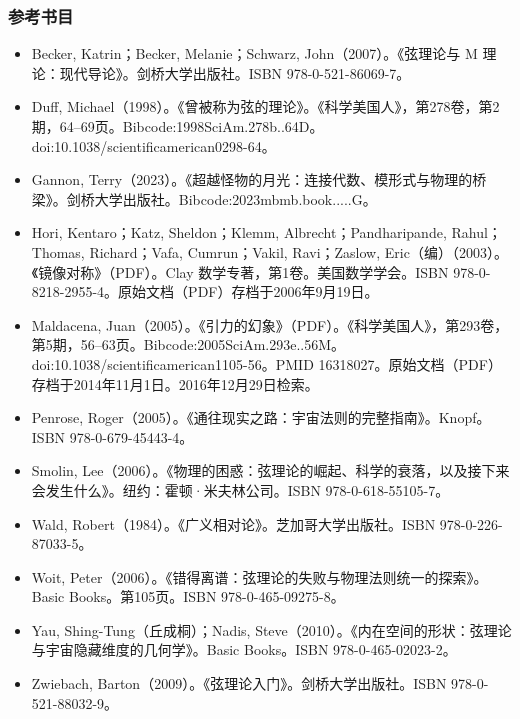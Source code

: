 \subsubsection{参考书目}  
\begin{itemize}
\item Becker, Katrin；Becker, Melanie；Schwarz, John（2007）。《弦理论与 M 理论：现代导论》。剑桥大学出版社。ISBN 978-0-521-86069-7。  
\item Duff, Michael（1998）。《曾被称为弦的理论》。《科学美国人》，第278卷，第2期，64–69页。Bibcode:1998SciAm.278b..64D。doi:10.1038/scientificamerican0298-64。  
\item Gannon, Terry（2023）。《超越怪物的月光：连接代数、模形式与物理的桥梁》。剑桥大学出版社。Bibcode:2023mbmb.book.....G。  
\item Hori, Kentaro；Katz, Sheldon；Klemm, Albrecht；Pandharipande, Rahul；Thomas, Richard；Vafa, Cumrun；Vakil, Ravi；Zaslow, Eric（编）（2003）。《镜像对称》（PDF）。Clay 数学专著，第1卷。美国数学学会。ISBN 978-0-8218-2955-4。原始文档（PDF）存档于2006年9月19日。  
\item Maldacena, Juan（2005）。《引力的幻象》（PDF）。《科学美国人》，第293卷，第5期，56–63页。Bibcode:2005SciAm.293e..56M。doi:10.1038/scientificamerican1105-56。PMID 16318027。原始文档（PDF）存档于2014年11月1日。2016年12月29日检索。  
\item Penrose, Roger（2005）。《通往现实之路：宇宙法则的完整指南》。Knopf。ISBN 978-0-679-45443-4。  
\item Smolin, Lee（2006）。《物理的困惑：弦理论的崛起、科学的衰落，以及接下来会发生什么》。纽约：霍顿·米夫林公司。ISBN 978-0-618-55105-7。  
\item Wald, Robert（1984）。《广义相对论》。芝加哥大学出版社。ISBN 978-0-226-87033-5。  
\item Woit, Peter（2006）。《错得离谱：弦理论的失败与物理法则统一的探索》。Basic Books。第105页。ISBN 978-0-465-09275-8。  
\item Yau, Shing-Tung（丘成桐）；Nadis, Steve（2010）。《内在空间的形状：弦理论与宇宙隐藏维度的几何学》。Basic Books。ISBN 978-0-465-02023-2。  
\item Zwiebach, Barton（2009）。《弦理论入门》。剑桥大学出版社。ISBN 978-0-521-88032-9。
\end{itemize}